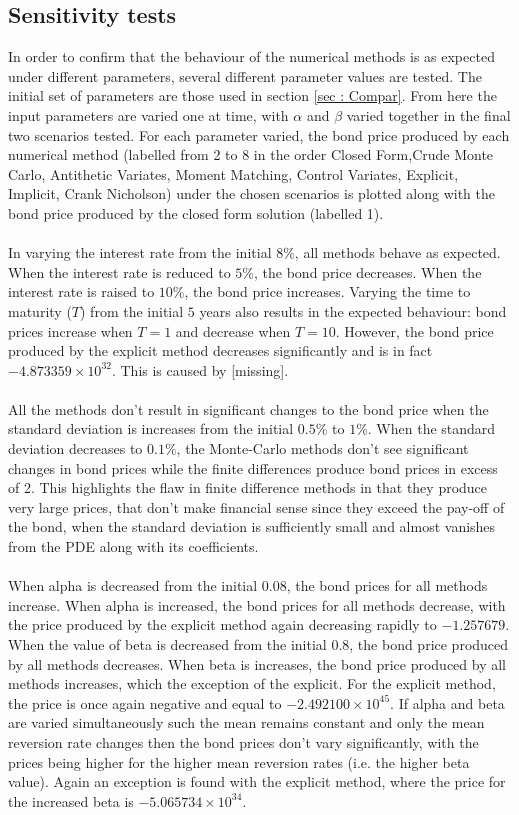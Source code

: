 \documentclass[12pt,a4paper]{article}
\begin{document}
\subsection{Sensitivity tests}
\label{subsec: Senses}
In order to confirm that the behaviour of the numerical methods is as expected under different parameters, several different parameter values are tested. The initial set of parameters are those used in section \ref{sec : Compar}. From here the input parameters are varied one at time, with $\alpha$ and $\beta$ varied together in the final two scenarios tested. For each parameter varied, the bond price produced by each numerical method (labelled from 2 to 8 in the order Closed Form,Crude Monte Carlo, Antithetic Variates, Moment Matching, Control Variates, Explicit, Implicit, Crank Nicholson) under the chosen scenarios is plotted along with the bond price produced by the closed form solution (labelled 1).\\\\
In varying the interest rate from the initial $8\%$, all methods behave as expected. When the interest rate is reduced to $5\%$, the bond price decreases. When the interest rate is raised to $10\%$, the bond price increases.	Varying the time to maturity ($T$) from the initial $5$ years also results in the expected behaviour: bond prices increase when $T=1$ and decrease when $T=10$. However, the bond price produced by the explicit method decreases significantly and is in fact $-4.873359\times10^{32}$. This is caused by [missing].\\\\
All the methods don't result in significant changes to the bond price when the standard deviation is increases from the initial $0.5\%$ to $1\%$. When the standard deviation decreases to $0.1\%$, the Monte-Carlo methods don't see significant changes in bond prices while the finite differences produce bond prices in excess of 2. This highlights the flaw in finite difference methods in that they produce very large prices, that don't make financial sense since they exceed the pay-off of the bond, when the standard deviation is sufficiently small and almost vanishes from the PDE along with its coefficients.\\\\
When alpha is decreased from the initial $0.08$, the bond prices for all methods increase. When alpha is increased, the bond prices for all methods decrease, with the price produced by the explicit method again decreasing rapidly to $-1.257679$. When the value of beta is decreased from the initial $0.8$, the bond price produced by all methods decreases. When beta is increases, the bond price produced by all methods increases, which the exception of the explicit. For the explicit method, the price is once again negative and equal to $-2.492100\times10^{45}$. If alpha and beta are varied simultaneously such the mean remains constant and only the mean reversion rate changes then the bond prices don't vary significantly, with the prices being higher for the higher mean reversion rates (i.e. the higher beta value). Again an exception is found with the explicit method, where the price for the increased beta is $-5.065734\times10^{34}$.
	\newpage
\end{document}
